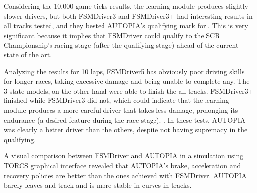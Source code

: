 Considering the 10.000 game ticks results, the learning module produces slightly slower drivers, but both FSMDriver3 and FSMDriver3+ had interesting results in all tracks tested, and they bested AUTOPIA's qualifying mark for . This is very significant because it implies that FSMDriver could qualify to the SCR Championship's racing stage (after the qualifying stage) ahead of the current state of the art.

Analyzing the results for 10 laps, FSMDriver5 has obviously poor driving skills for longer races, taking excessive damage and being unable to complete any. The 3-state models, on the other hand were able to finish the all tracks. FSMDriver3+ finished  while FSMDriver3 did not, which could indicate that the learning module produces a more careful driver that takes less damage, prolonging its endurance (a desired feature during the race stage). . In these tests, AUTOPIA was clearly a better driver than the others, despite not having supremacy in the qualifying.

A visual comparison between FSMDriver and AUTOPIA in a simulation using TORCS graphical interface revealed that AUTOPIA's brake, acceleration and recovery policies are better than the ones achieved with FSMDriver. AUTOPIA barely leaves and track and is more stable in curves in  tracks.